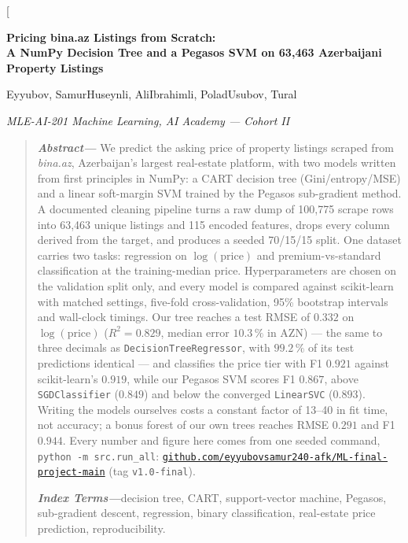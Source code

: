 \documentclass[10pt,twocolumn,a4paper]{article}
\newcommand{\abstractkw}[1]{\noindent\textbf{\textit{#1}}}
\begin{document}
\twocolumn[
  \begin{@twocolumnfalse}
  \begin{center}
    {\LARGE\bfseries Pricing bina.az Listings from Scratch:\\A NumPy Decision Tree and a Pegasos SVM
      on 63{,}463 Azerbaijani Property Listings\par}
    \vspace{1.2em}
    {\large
      Eyyubov, Samur\quad Huseynli, Ali\quad Ibrahimli, Polad\quad Usubov, Tural\par}
    \vspace{0.5em}
    {\itshape MLE-AI-201 Machine Learning, AI Academy --- Cohort II\par}
    \vspace{1.4em}
  \end{center}
  \begin{quote}
    \small
    \abstractkw{Abstract---}%
    We predict the asking price of property listings scraped from
    \emph{bina.az}, Azerbaijan's largest real-estate platform, with two models
    written from first principles in NumPy: a CART decision tree
    (Gini/entropy/MSE) and a linear soft-margin SVM trained by the Pegasos
    sub-gradient method. A documented cleaning pipeline turns a raw dump of
    100{,}775 scrape rows into 63{,}463 unique listings and 115 encoded
    features, drops every column derived from the target, and produces a
    seeded 70/15/15 split. One dataset carries two tasks: regression on
    $\log(\text{price})$ and premium-vs-standard classification at the
    training-median price. Hyperparameters are chosen on the validation split
    only, and every model is compared against scikit-learn with matched
    settings, five-fold cross-validation, 95\% bootstrap intervals and
    wall-clock timings. Our tree reaches a test RMSE of $0.332$ on
    $\log(\text{price})$ ($R^2=0.829$, median error $10.3\,\%$ in AZN) ---
    the same to three decimals as \texttt{DecisionTreeRegressor}, with
    $99.2\,\%$ of its test predictions identical --- and classifies the price
    tier with F1 $0.921$ against scikit-learn's $0.919$, while our Pegasos SVM
    scores F1 $0.867$, above \texttt{SGDClassifier} ($0.849$) and below the
    converged \texttt{LinearSVC} ($0.893$). Writing the models ourselves costs
    a constant factor of 13--40 in fit time, not accuracy; a bonus forest of
    our own trees reaches RMSE $0.291$ and F1 $0.944$. Every number and figure
    here comes from one seeded command, \texttt{python -m src.run\_all}:
    \href{https://github.com/eyyubovsamur240-afk/ML-final-project-main}{\texttt{github.com/eyyubovsamur240-afk/ML-final-project-main}}
    (tag \texttt{v1.0-final}).

    \vspace{0.6em}
    \abstractkw{Index Terms---}decision tree, CART, support-vector machine,
    Pegasos, sub-gradient descent, regression, binary classification,
    real-estate price prediction, reproducibility.
  \end{quote}
  \vspace{1.0em}
  \end{@twocolumnfalse}
\end{document}
